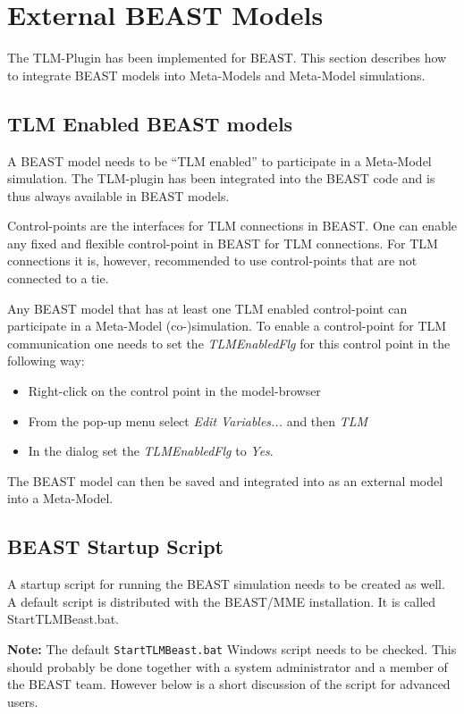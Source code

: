 \chapter{External BEAST Models}
The TLM-Plugin has been implemented for BEAST. This section describes
how to integrate BEAST models into Meta-Models and Meta-Model
simulations.

\section{TLM Enabled BEAST models}
A BEAST model needs to be ``TLM enabled'' to participate in a
Meta-Model simulation. The TLM-plugin has been integrated into the
BEAST code and is thus always available in BEAST models.

Control-points are the interfaces for TLM connections in BEAST. One
can enable any fixed and flexible control-point in BEAST for TLM
connections. For TLM connections it is, however, recommended to use
control-points that are not connected to a tie.

Any BEAST model that has at least one TLM enabled control-point can
participate in a Meta-Model (co-)simulation. To enable a control-point
for TLM communication one needs to set the {\em TLMEnabledFlg} for
this control point in the following way:
\begin{itemize}
\item Right-click on the control point in the model-browser
\item From the pop-up menu select {\em Edit Variables...} and then
{\em TLM}
\item In the dialog set the {\em TLMEnabledFlg} to {\em Yes}.
\end{itemize}


The BEAST model can then be saved and integrated into as an external
model into a Meta-Model.


\section{BEAST Startup Script}
A startup script for running the BEAST simulation needs to be created
as well. A default script is distributed with the BEAST/MME
installation. It is called StartTLMBeast.bat.

{\bf Note:} The default \verb!StartTLMBeast.bat! Windows script needs to
be checked. This should probably be done together with a system
administrator and a member of the BEAST team. However below is a short
discussion of the script for advanced users.

